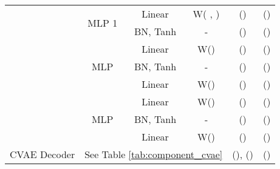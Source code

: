 \documentclass[sigconf,screen,nonacm]{acmart}
\begin{document}
\begin{table}[!t]
{\begin{tabular}{c|ccc|c|c}
				& \multicolumn{1}{c|}{\multirow{2}{*}{MLP 1}}  & \multicolumn{1}{c|}{Linear}  & W( , )       & ()    & ()                 \\ \cline{3-6} 
				& \multicolumn{1}{c|}{}                              & \multicolumn{1}{c|}{BN, Tanh} & -               & ()   & ()                 \\ \hline
				\multirow{6}{*}{} & \multicolumn{1}{c|}{\multirow{3}{*}{MLP }} & \multicolumn{1}{c|}{Linear}   & W()             & ()  & ()                 \\ \cline{3-6} 
				& \multicolumn{1}{c|}{}                              & \multicolumn{1}{c|}{BN, Tanh} &  -                      & ()   & ()                 \\ \cline{3-6} 
				& \multicolumn{1}{c|}{}                              & \multicolumn{1}{c|}{Linear}   & W()              & ()   & ()                 \\ \cline{2-6} 
				& \multicolumn{1}{c|}{\multirow{3}{*}{MLP }} & \multicolumn{1}{c|}{Linear}   & W()             & ()  & ()                 \\ \cline{3-6} 
				& \multicolumn{1}{c|}{}                              & \multicolumn{1}{c|}{BN, Tanh} &  -                      & ()   & ()                 \\ \cline{3-6} 
				& \multicolumn{1}{c|}{}                              & \multicolumn{1}{c|}{Linear}   & W()              & ()   & ()                 \\ \hline
				CVAE Decoder                 & \multicolumn{3}{c|}{See Table \ref{tab:component_cvae} }                                  & (), () & () \\ \bottomrule
			\end{tabular}
		}
	\end{table}
	
\end{document}
